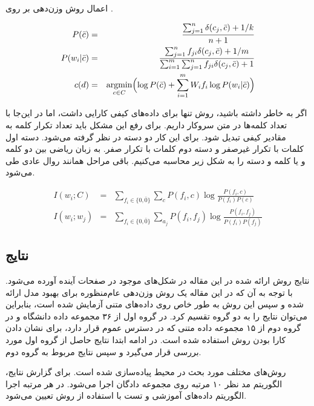 \documentclass[12pt, a4paper]{article}
\DeclareMathOperator*{\argmin}{argmin}
\begin{document}
اعمال روش وزن‌دهی بر روی .

\begin{eqnarray}
    P(\bar{c}) & = & \frac{\sum_{j=1}^{n}\delta(c_j, \bar{c}) + 1/k}{n+1} \\
    P(w_i|\bar{c}) & = & \frac{\sum_{j=1}^{n} f_{ji}\delta(c_j, \bar{c}) + 1/m}{\sum_{i=1}^{m}\sum_{j=1}^{n}f_{ji}\delta(c_j,\bar{c})+1} \\
    c(d) & = & \argmin_{c \in C} \Bigl(\log P(\bar{c}) + \sum_{i=1}^{m} W_i f_i \log P(w_i| \bar{c})\Bigr)
\end{eqnarray}

اگر به خاطر داشته باشید، روش  تنها برای داده‌های کیفی کارایی داشت، اما در این‌جا
با تعداد کلمه‌ها در متن سروکار داریم. برای رفع این مشکل باید تعداد تکرار کلمه
به مقادیر کیفی تبدیل شود. برای این کار دو دسته در نظر گرفته می‌شود. دسته اول کلمات با
تکرار غیرصفر و دسته دوم کلمات با تکرار صفر. به زبان ریاضی 
بین دو کلمه و یا کلمه و دسته را به شکل زیر محاسبه می‌کنیم. باقی مراحل همانند روال
عادی طی می‌شود.

\begin{eqnarray}
    I(w_i; C) & = & \sum_{f_i \in \{0, \bar{0}\}}\sum_{c} P(f_i, c) \log\frac{P(f_i, c)}{P(f_i)P(c)} \\
    I(w_i; w_j) & = & \sum_{f_i \in \{0, \bar{0}\}}\sum_{a_j} P(f_i, f_j) \log \frac{P(f_i, f_j)}{P(f_i) P(f_j)}
\end{eqnarray}

\subsection*{نتایج}

نتایج روش ارائه شده در این مقاله در شکل‌های موجود در صفحات آینده آورده می‌شود.
با توجه به آن که در این مقاله یک روش وزن‌دهی عام‌منظوره برای بهبود مدل
 ارائه شده و سپس این روش به طور خاص روی داده‌های متنی آزمایش
شده است، بنابراین می‌توان نتایج را به دو گروه تقسیم کرد. در گروه اول از ۳۶
مجموعه داده دانشگاه  و در گروه دوم از ۱۵ مجموعه داده
متنی که در دسترس عموم قرار دارد، برای نشان دادن کارا بودن روش استفاده شده است.
در ادامه ابتدا نتایج حاصل از گروه اول مورد بررسی قرار می‌گیرد و سپس
نتایج مربوط به گروه دوم.

روش‌های مختلف مورد بحث در محیط  پیاده‌سازی شده است. برای گزارش نتایج،
الگوریتم مد نظر ۱۰ مرتبه روی مجموعه دادگان اجرا می‌شود. در هر مرتبه
اجرا الگوریتم داده‌های آموزشی و تست با استفاده از روش
 تعیین می‌شود.
\end{document}
